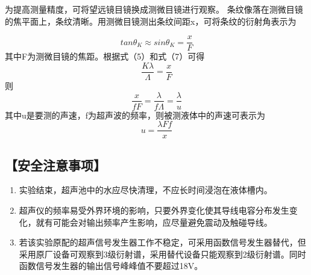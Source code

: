 \documentclass[12pt,a4paper,UTF8]{ctexart}
\begin{document}
\begin{figure}[htbp]
	\centering
	\caption{}
	\label{fig:tcvi}
\end{figure}

为提高测量精度，可将望远镜目镜换成测微目镜进行观察。
条纹像落在测微目镜的焦平面上，条纹清晰。用测微目镜测出条纹间距x，可将条纹的衍射角表示为

\begin{equation}
	tan \theta_K\approx sin\theta_K=\frac{x}{F}
\end{equation}
其中F为测微目镜的焦距。根据式（5）和式（7）可得
\begin{equation}
	\frac{K\lambda}{\varLambda }=\frac{x}{F}
\end{equation}
则
\begin{equation}
	\frac{x}{fF}=\frac{\lambda}{f\varLambda}=\frac{\lambda}{u}
\end{equation}
其中u是要测的声速，f为超声波的频率，则被测液体中的声速可表示为
\begin{equation}
	u=\frac{\lambda F f}{x}
\end{equation}

\subsection*{【安全注意事项】}
    \begin{enumerate}
		\item 实验结束，超声池中的水应尽快清理，不应长时间浸泡在液体槽内。
		\item 超声仪的频率易受外界环境的影响，只要外界变化使其导线电容分布发生变化，就有可能会对输出频率产生影响，应尽量避免震动及触碰导线。
		\item 若该实验原配的超声信号发生器工作不稳定，可采用函数信号发生器替代，但采用原厂设备可观察到3级衍射谱，采用替代设备只能观察到2级衍射谱。同时函数信号发生器的输出信号峰峰值不要超过18V。
	\end{enumerate}
\end{document}
